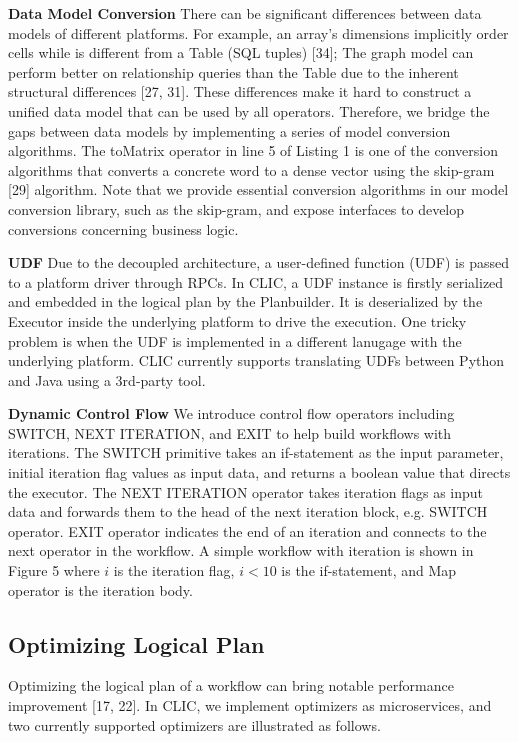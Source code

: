 \textbf{Data Model Conversion} 
There can be significant differences between data models of different platforms.
For example, an array’s dimensions implicitly order cells while is different from a Table (SQL tuples) [34]; 
The graph model can perform better on relationship queries than the Table due to the inherent structural differences [27, 31]. 
These differences make it hard to construct a unified data model that can be used by all operators. 
Therefore, we bridge the gaps between data models by implementing a series of model conversion algorithms. 
The toMatrix operator in line 5 of Listing 1 is one of the conversion algorithms that converts a concrete word to a dense vector using the skip-gram [29] algorithm. 
Note that we provide essential conversion algorithms in our model conversion library, such as the skip-gram, and expose interfaces to develop conversions concerning business logic.

\textbf{UDF}  Due to the decoupled architecture, a user-defined function (UDF) is passed to a platform driver through RPCs. 
In CLIC, a UDF instance is firstly serialized and embedded in the logical plan by the Planbuilder. 
It is deserialized by the Executor inside the underlying platform to drive the execution. 
One tricky problem is when the UDF is implemented in a different lanugage with the underlying platform. 
CLIC currently supports translating UDFs between Python and Java using a 3rd-party tool.

\textbf{Dynamic Control Flow} We introduce control flow operators including SWITCH, NEXT ITERATION, and EXIT to help build workflows with iterations. 
The SWITCH primitive takes an if-statement as the input parameter, initial iteration flag values as input data, and returns a boolean value that directs the executor. 
The NEXT ITERATION operator takes iteration flags as input data and forwards them to the head of the next iteration block, e.g. SWITCH operator. 
EXIT operator indicates the end of an iteration and connects to the next operator in the workflow.
A simple workflow with iteration is shown in Figure 5 where $i$ is the iteration flag, $i < 10$ is the if-statement, and Map operator is the iteration body.

\subsection{Optimizing Logical Plan}
Optimizing the logical plan of a workflow can bring notable performance improvement [17, 22].
In CLIC, we implement optimizers as microservices, and two currently supported optimizers are illustrated as follows.

